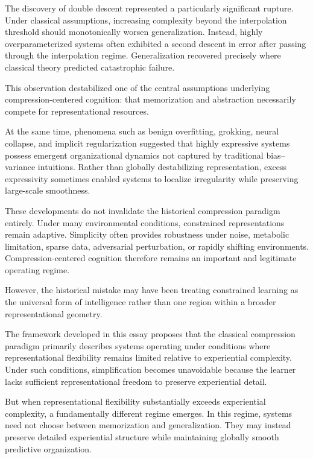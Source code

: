 \documentclass[12pt,a4paper]{article}
\begin{document}
The discovery of double descent represented a particularly significant rupture. Under classical assumptions, increasing complexity beyond the interpolation threshold should monotonically worsen generalization. Instead, highly overparameterized systems often exhibited a second descent in error after passing through the interpolation regime. Generalization recovered precisely where classical theory predicted catastrophic failure.

This observation destabilized one of the central assumptions underlying compression-centered cognition: that memorization and abstraction necessarily compete for representational resources.

At the same time, phenomena such as benign overfitting, grokking, neural collapse, and implicit regularization suggested that highly expressive systems possess emergent organizational dynamics not captured by traditional bias--variance intuitions. Rather than globally destabilizing representation, excess expressivity sometimes enabled systems to localize irregularity while preserving large-scale smoothness.

These developments do not invalidate the historical compression paradigm entirely. Under many environmental conditions, constrained representations remain adaptive. Simplicity often provides robustness under noise, metabolic limitation, sparse data, adversarial perturbation, or rapidly shifting environments. Compression-centered cognition therefore remains an important and legitimate operating regime.

However, the historical mistake may have been treating constrained learning as the universal form of intelligence rather than one region within a broader representational geometry.

The framework developed in this essay proposes that the classical compression paradigm primarily describes systems operating under conditions where representational flexibility remains limited relative to experiential complexity. Under such conditions, simplification becomes unavoidable because the learner lacks sufficient representational freedom to preserve experiential detail.

But when representational flexibility substantially exceeds experiential complexity, a fundamentally different regime emerges. In this regime, systems need not choose between memorization and generalization. They may instead preserve detailed experiential structure while maintaining globally smooth predictive organization.
\end{document}
